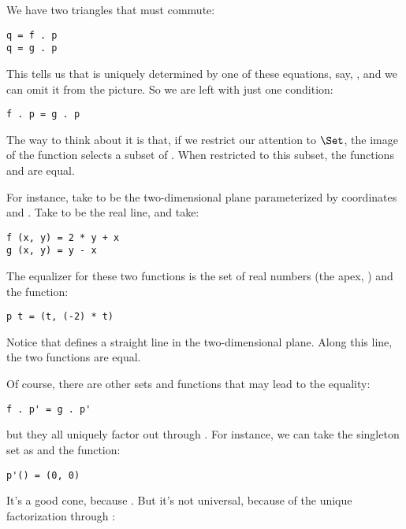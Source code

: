 \noindent
We have two triangles that must commute:

\begin{Verbatim}[commandchars=\\\{\}]
q = f . p 
q = g . p
\end{Verbatim}
This tells us that  is uniquely determined by one of these
equations, say, , and we can omit it from the
picture. So we are left with just one condition:

\begin{Verbatim}[commandchars=\\\{\}]
f . p = g . p
\end{Verbatim}
The way to think about it is that, if we restrict our attention to
$\Set$, the image of the function  selects a subset of
. When restricted to this subset, the functions  and
 are equal.

For instance, take  to be the two-dimensional plane
parameterized by coordinates  and . Take 
to be the real line, and take:

\begin{Verbatim}[commandchars=\\\{\}]
f (x, y) = 2 * y + x 
g (x, y) = y - x
\end{Verbatim}
The equalizer for these two functions is the set of real numbers (the
apex, ) and the function:

\begin{Verbatim}[commandchars=\\\{\}]
p t = (t, (-2) * t)
\end{Verbatim}
Notice that  defines a straight line in the
two-dimensional plane. Along this line, the two functions are equal.

Of course, there are other sets  and functions
 that may lead to the equality:

\begin{Verbatim}[commandchars=\\\{\}]
f . p' = g . p'
\end{Verbatim}
but they all uniquely factor out through . For instance, we
can take the singleton set \code{()} as  and the
function:

\begin{Verbatim}[commandchars=\\\{\}]
p'() = (0, 0)
\end{Verbatim}
It's a good cone, because . But it's
not universal, because of the unique factorization through :


